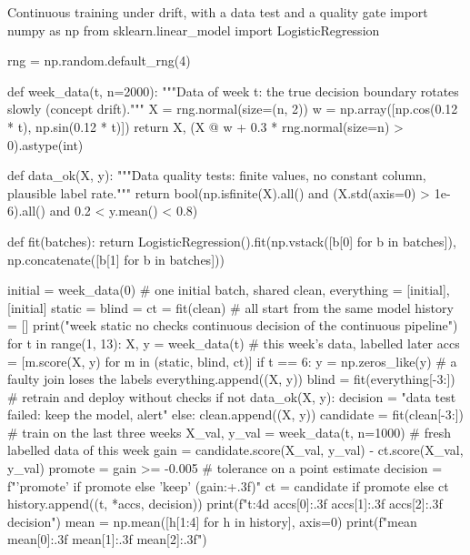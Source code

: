 \begin{pylisting}[label={lst:ct}]{Continuous training under drift, with a data test and a quality gate}
import numpy as np
from sklearn.linear_model import LogisticRegression

rng = np.random.default_rng(4)

def week_data(t, n=2000):
    """Data of week t: the true decision boundary rotates slowly (concept drift)."""
    X = rng.normal(size=(n, 2))
    w = np.array([np.cos(0.12 * t), np.sin(0.12 * t)])
    return X, (X @ w + 0.3 * rng.normal(size=n) > 0).astype(int)

def data_ok(X, y):
    """Data quality tests: finite values, no constant column, plausible label rate."""
    return bool(np.isfinite(X).all() and (X.std(axis=0) > 1e-6).all()
                and 0.2 < y.mean() < 0.8)

def fit(batches):
    return LogisticRegression().fit(np.vstack([b[0] for b in batches]),
                                    np.concatenate([b[1] for b in batches]))

initial = week_data(0)                               # one initial batch, shared
clean, everything = [initial], [initial]
static = blind = ct = fit(clean)                     # all start from the same model
history = []
print("week  static  no checks  continuous  decision of the continuous pipeline")
for t in range(1, 13):
    X, y = week_data(t)                              # this week's data, labelled later
    accs = [m.score(X, y) for m in (static, blind, ct)]
    if t == 6:
        y = np.zeros_like(y)                         # a faulty join loses the labels
    everything.append((X, y))
    blind = fit(everything[-3:])                     # retrain and deploy without checks
    if not data_ok(X, y):
        decision = "data test failed: keep the model, alert"
    else:
        clean.append((X, y))
        candidate = fit(clean[-3:])                  # train on the last three weeks
        X_val, y_val = week_data(t, n=1000)          # fresh labelled data of this week
        gain = candidate.score(X_val, y_val) - ct.score(X_val, y_val)
        promote = gain >= -0.005                     # tolerance on a point estimate
        decision = f"{'promote' if promote else 'keep'} ({gain:+.3f})"
        ct = candidate if promote else ct
    history.append((t, *accs, decision))
    print(f"{t:4d}   {accs[0]:.3f}    {accs[1]:.3f}      {accs[2]:.3f}    {decision}")
mean = np.mean([h[1:4] for h in history], axis=0)
print(f"mean   {mean[0]:.3f}    {mean[1]:.3f}      {mean[2]:.3f}")
\end{pylisting}
